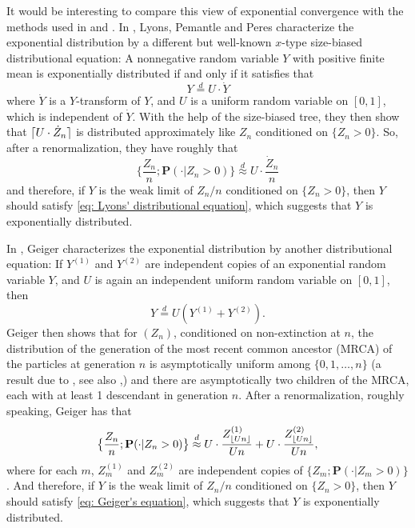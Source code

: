 \documentclass[12pt,a4paper]{amsart}
\DeclarePairedDelimiter\ceil{\lceil}{\rceil}
\DeclarePairedDelimiter\floor{\lfloor}{\rfloor}
\numberwithin{equation}{section}
\begin{document}
	It would be interesting to compare this view of exponential convergence with the methods used in \cite{geiger2000new} and \cite{lyons1995conceptual}.
	In \cite{lyons1995conceptual}, Lyons, Pemantle and Peres characterize the exponential distribution by a different 
but well-known $x$-type size-biased distributional equation:
	A nonnegative random variable $Y$ with positive finite mean is exponentially distributed if and only if it satisfies that
\begin{equation}
\label{eq: Lyons' distributional equation}
		Y 		\overset{d}= U \cdot \dot Y
\end{equation}
   where $\dot Y$ is a $Y$-transform of $Y$,  and $U$ is a uniform random variable on 
$[0,1]$, which is independent of $\dot Y$.
    With the help of the size-biased tree, they then show that $\ceil{U \cdot \dot Z_n}$ is distributed approximately like $Z_n$ conditioned on $\{Z_n > 0\}$.
	So, after a renormalization, they have roughly that
\begin{equation}
\label{eq: Lyons' insight}
	\big\{\frac{Z_n}{n} ; \mathbf P(  \cdot| Z_n > 0) \big\}
	\overset{d}{\approx} U \cdot \frac{ \dot Z_n}{n}
\end{equation}
	and therefore, if $Y$ is the weak limit of $Z_n/n$ conditioned on $\{Z_n > 0\}$,
	then $Y$ should satisfy \eqref{eq: Lyons' distributional equation}, which suggests that $Y$ is exponentially distributed.
	
	In \cite{geiger2000new}, Geiger characterizes the exponential distribution by another distributional equation:
		If $Y^{(1)}$ and $Y^{(2)}$ are independent copies of an exponential random variable $Y$, and $U$ is again an independent uniform random variable on $[0,1]$, then
\begin{equation}
\label{eq: Geiger's equation}
	Y	\overset{d} = U (Y^{(1)} + Y^{(2)}).
\end{equation}
	Geiger then shows that for $(Z_n)$, conditioned on non-extinction at $n$, 
	the distribution of the generation of the most recent common ancestor (MRCA) of the particles at generation $n$ is asymptotically uniform among $\{0,1,\dots,n\}$ (a result due to \cite{Zubkov1975}, see also \cite{geiger1999elementary},) and there are asymptotically two children of 
the MRCA, each with at least 1 descendant in generation $n$.
	After a renormalization, roughly speaking, Geiger has that
\begin{equation}
\label{eq: Geiger's insight}
	\big\{\frac{Z_n}{n} ; \mathbf P(  \cdot| Z_n > 0) \big\}
		\overset{d}{\approx} U \cdot \frac{ Z^{(1)}_{  \floor{Un}  }}{Un} + U \cdot \frac{ Z^{(2)}_{ \floor{Un} }}{Un} ,
\end{equation}
	where for each $m$, $Z_m^{(1)}$ and $Z_m^{(2)}$ are independent copies of $\{Z_m; \mathbf P(\cdot | Z_m > 0)\}$.
	And therefore, if $Y$ is the weak limit of $Z_n/n$ conditioned on $\{Z_n > 0\}$, then $Y$ should satisfy \eqref{eq: Geiger's equation}, which suggests that $Y$ is exponentially distributed.
	
\end{document}
